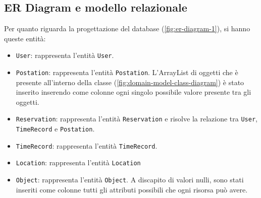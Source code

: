 \documentclass{article}
\begin{document}
\subsection{ER Diagram e modello relazionale}\label{subsec:ERdiagram}
Per quanto riguarda la progettazione del database (\ref{fig:er-diagram-1}), si hanno queste entità:
\begin{itemize}
     \item \texttt{User}: rappresenta l'entità \texttt{User}.
            \item \texttt{Postation}: rappresenta l'entità \texttt{Postation}. L'ArrayList di oggetti che è presente all'interno della classe (\ref{fig:domain-model-class-diagram}) è stato inserito inserendo come colonne ogni singolo possibile valore presente tra gli oggetti.
            \item \texttt{Reservation}: rappresenta l'entità \texttt{Reservation} e risolve la relazione tra \texttt{User}, \texttt{TimeRecord} e \texttt{Postation}.
            \item \texttt{TimeRecord}: rappresenta l'entità \texttt{TimeRecord}.
            \item \texttt{Location}: rappresenta l'entità \texttt{Location}
            \item \texttt{Object}: rappresenta l'entità \texttt{Object}. A discapito di valori nulli, sono stati inseriti come colonne tutti gli attributi possibili che ogni risorsa può avere.
\end{itemize}
\end{document}
